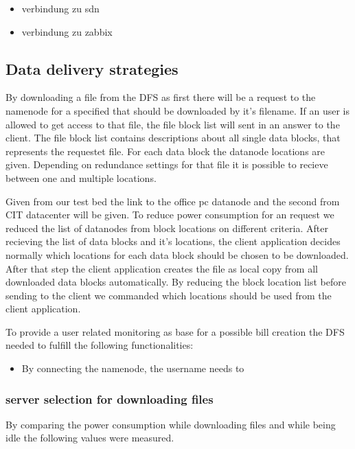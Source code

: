 \begin{itemize}
	\item verbindung zu sdn
	\item verbindung zu zabbix
\end{itemize}

\subsection{Data delivery strategies}

By downloading a file from the DFS as first there will be a request to the namenode for a specified that should be downloaded by it's filename. If an user is allowed to get access to that file, the file block list will sent in an answer to the client. The file block list contains descriptions about all single data blocks, that represents the requestet file. For each data block the datanode locations are given. Depending on redundance settings for that file it is possible to recieve between one and multiple locations. 

Given from our test bed the link to the office pc datanode and the second from CIT datacenter will be given. To reduce power consumption for an request we reduced the list of datanodes from block locations on different criteria. After recieving the list of data blocks and it's locations, the client application decides normally which locations for each data block should be chosen to be downloaded. After that step the client application creates the file as local copy from all downloaded data blocks automatically. By reducing the block location list before sending to the client we commanded which locations should be used from the client application.

To provide a user related monitoring as base for a possible bill creation the DFS needed to fulfill the following functionalities:

\begin{itemize}
	\item By connecting the namenode, the username needs to 
\end{itemize}

\subsubsection{server selection for downloading files}

By comparing the power consumption while downloading files and while being idle the following values were measured.

